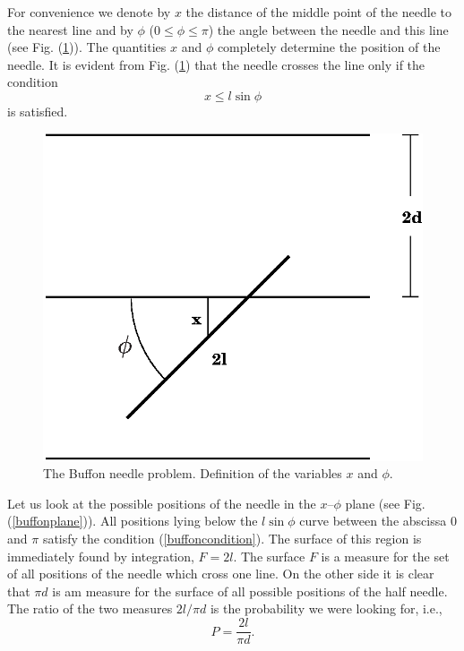 For convenience we denote by $x$ the distance of the middle point of
the needle to the nearest line and by $\phi$ ($0 \le \phi \le \pi$) the
angle between the needle and this line (see
Fig. (\ref{buffondefinition})). The quantities $x$ and $\phi$
completely determine the position of the needle. It is evident from
Fig. (\ref{buffondefinition}) that the needle crosses the line only if
the condition
\begin{equation}
\label{buffoncondition}
x \le l \sin \phi
\end{equation}
is satisfied.

\begin{figure}
\label{buffondefinition}
\includegraphics[width=.7\textwidth]{Figures/buffondefinition.eps}
\caption{The Buffon needle problem. Definition of the variables $x$
  and $\phi$.}
\end{figure}

Let us look at the possible positions of the needle in the $x$--$\phi$
plane (see Fig. (\ref{buffonplane})). All positions lying below the
$l\sin \phi$ curve between the abscissa 0 and $\pi$ satisfy the
condition (\ref{buffoncondition}). The surface of this region is
immediately found by integration, $F=2l$. The surface $F$ is a measure
for the set of all positions of the needle which cross one line. On
the other side it is clear that $\pi d$ is am measure for the surface
of all possible positions of the half needle. The ratio of the two
measures $ 2l/\pi d$ is the probability we were looking for, i.e.,
\begin{equation}
\label{buffonprobability}
P = \frac{2 l}{\pi d}.
\end{equation}

